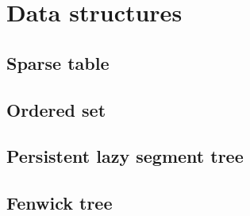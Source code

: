 \section{Data structures}

\subsection{Sparse table}

\subsection{Ordered set}

\subsection{Persistent lazy segment tree}

\subsection{Fenwick tree}
